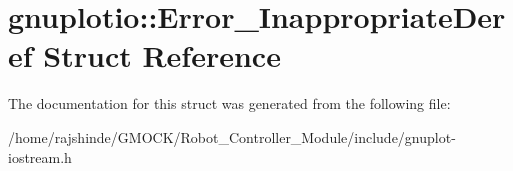 \hypertarget{structgnuplotio_1_1_error___inappropriate_deref}{}\section{gnuplotio\+:\+:Error\+\_\+\+Inappropriate\+Deref Struct Reference}
\label{structgnuplotio_1_1_error___inappropriate_deref}


The documentation for this struct was generated from the following file\+:\begin{DoxyCompactItemize}
\item 
/home/rajshinde/\+G\+M\+O\+C\+K/\+Robot\+\_\+\+Controller\+\_\+\+Module/include/gnuplot-\/iostream.\+h\end{DoxyCompactItemize}
